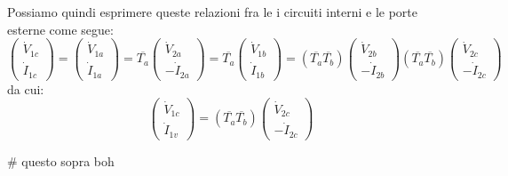 \documentclass[a4paper,11pt]{article}
\begin{document}
Possiamo quindi esprimere queste relazioni fra le i circuiti interni e le porte esterne come segue:
$$
\begin{pmatrix}
	\dot{V}_{1c} \\ \dot{I}_{1c}
\end{pmatrix}
=
\begin{pmatrix}
	\dot{V}_{1a} \\ \dot{I}_{1a}
\end{pmatrix}
=
\overline{T_a}
\begin{pmatrix}
	\dot{V}_{2a} \\ - \dot{I}_{2a}
\end{pmatrix}
=
\overline{T_a}
\begin{pmatrix}
	\dot{V}_{1b} \\ \dot{I}_{1b}
\end{pmatrix}
=
(\overline{T_a} \overline{T_b}) 
\begin{pmatrix}
	\dot{V}_{2b} \\ -\dot{I}_{2b}
\end{pmatrix}
(\overline{T_a} \overline{T_b})
\begin{pmatrix}
	\dot{V}_{2c} \\ -\dot{I}_{2c}
\end{pmatrix}
$$
da cui:
$$
\begin{pmatrix}
	\dot{V}_{1c} \\ \dot{I}_{1v} 
\end{pmatrix}
=
(\overline{T_a} \overline{T_b})
\begin{pmatrix}
	\dot{V}_{2c} \\ -\dot{I}_{2c}
\end{pmatrix}
$$

# questo sopra boh
\end{document}
